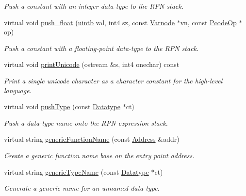 \begin{DoxyCompactItemize}
\begin{DoxyCompactList}\small\item\em Push a constant with an integer data-\/type to the R\+PN stack. \end{DoxyCompactList}\item 
virtual void \mbox{\hyperlink{class_print_c_a5770972840193a1f118925fbb92fa4b2}{push\+\_\+float}} (\mbox{\hyperlink{types_8h_a2db313c5d32a12b01d26ac9b3bca178f}{uintb}} val, int4 sz, const \mbox{\hyperlink{class_varnode}{Varnode}} $\ast$vn, const \mbox{\hyperlink{class_pcode_op}{Pcode\+Op}} $\ast$op)
\begin{DoxyCompactList}\small\item\em Push a constant with a floating-\/point data-\/type to the R\+PN stack. \end{DoxyCompactList}\item 
virtual void \mbox{\hyperlink{class_print_c_a56fdbb426ff8dda0d3dd29901f09ead1}{print\+Unicode}} (ostream \&s, int4 onechar) const
\begin{DoxyCompactList}\small\item\em Print a single unicode character as a {\itshape character} {\itshape constant} for the high-\/level language. \end{DoxyCompactList}\item 
virtual void \mbox{\hyperlink{class_print_c_a210e44709553449b4d03596f137dfb10}{push\+Type}} (const \mbox{\hyperlink{class_datatype}{Datatype}} $\ast$ct)
\begin{DoxyCompactList}\small\item\em Push a data-\/type name onto the R\+PN expression stack. \end{DoxyCompactList}\item 
virtual string \mbox{\hyperlink{class_print_c_af262dab8c2593fce9a9bceac82a8eb9c}{generic\+Function\+Name}} (const \mbox{\hyperlink{class_address}{Address}} \&addr)
\begin{DoxyCompactList}\small\item\em Create a generic function name base on the entry point address. \end{DoxyCompactList}\item 
virtual string \mbox{\hyperlink{class_print_c_a9be29ae351e163eeead58aeb5eb5720b}{generic\+Type\+Name}} (const \mbox{\hyperlink{class_datatype}{Datatype}} $\ast$ct)
\begin{DoxyCompactList}\small\item\em Generate a generic name for an unnamed data-\/type. \end{DoxyCompactList}\item 

\end{DoxyCompactItemize}

